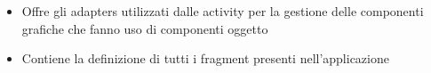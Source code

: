 \begin{minipage}{0.45\textwidth}
\begin{itemize}
        \item {} \rightarrow Offre gli adapters \footnotemark {} utilizzati dalle activity per la gestione delle componenti grafiche che fanno uso di componenti oggetto
        \item {} \rightarrow Contiene la definizione di tutti i fragment \footnotemark {} presenti nell'applicazione
      \end{itemize}

    \end{minipage}

    
